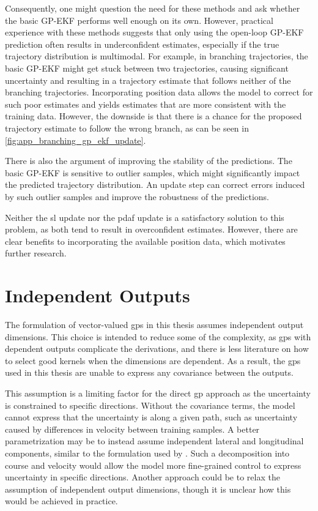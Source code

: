 Consequently, one might question the need for these methods and ask whether the basic GP-EKF performs well enough on its own. However, practical experience with these methods suggests that only using the open-loop GP-EKF prediction often results in underconfident estimates, especially if the true trajectory distribution is multimodal. For example, in branching trajectories, the basic GP-EKF might get stuck between two trajectories, causing significant uncertainty and resulting in a trajectory estimate that follows neither of the branching trajectories. Incorporating position data allows the model to correct for such poor estimates and yields estimates that are more consistent with the training data. However, the downside is that there is a chance for the proposed trajectory estimate to follow the wrong branch, as can be seen in \cref{fig:app_branching_gp_ekf_update}.

There is also the argument of improving the stability of the predictions. The basic GP-EKF is sensitive to outlier samples, which might significantly impact the predicted trajectory distribution. An update step can correct errors induced by such outlier samples and improve the robustness of the predictions. 

Neither the \acrshort{sl} update nor the \acrshort{pdaf} update is a satisfactory solution to this problem, as both tend to result in overconfident estimates. However, there are clear benefits to incorporating the available position data, which motivates further research.    



\section{Independent Outputs}
The formulation of vector-valued \acrshort{gp}s in this thesis assumes independent output dimensions. This choice is intended to reduce some of the complexity, as \acrshort{gp}s with dependent outputs complicate the derivations, and there is less literature on how to select good kernels when the dimensions are dependent. As a result, the \acrshort{gp}s used in this thesis are unable to express any covariance between the outputs. 

This assumption is a limiting factor for the direct \acrshort{gp} approach as the uncertainty is constrained to specific directions. Without the covariance terms, the model cannot express that the uncertainty is along a given path, such as uncertainty caused by differences in velocity between training samples. A better parametrization may be to instead assume independent lateral and longitudinal components, similar to the formulation used by \cite{gp_ais_trajectory}. Such a decomposition into course and velocity would allow the model more fine-grained control to express uncertainty in specific directions. Another approach could be to relax the assumption of independent output dimensions, though it is unclear how this would be achieved in practice. 


